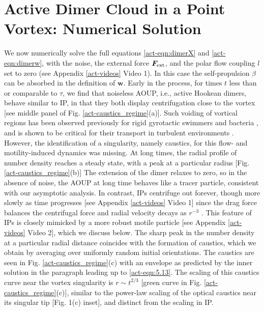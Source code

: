 \documentclass[../Rajarshi-thesis-draft.tex]{subfiles}
\begin{document}
\section{Active Dimer Cloud in a Point Vortex: Numerical Solution}
\label{act-hookeancloud}
We now numerically solve the full equations \eqref{act-eqn:dimerX} and \eqref{act-eqn:dimerw}, with the noise, the external force $\vec{F}_{\rm ext}$, %
and the polar flow coupling $l$ set to zero (see Appendix \ref{act-videos} Video 1). In this case the self-propulsion $\beta$ can be absorbed in the definition of $\mathbf{w}$. 
Early in the process, for times $t$ less than or comparable to $\tau$, we find that noiseless AOUP, i.e., active Hookean dimers, behave similar to IP, in that they both display centrifugation close to the vortex [see middle panel of Fig. \ref{act-caustics_regime}(a)]. Such voiding of vortical regions has been observed previously 
for rigid gyrotactic swimmers \cite{Durham2011} and bacteria \cite{Sokolov2016}, and is shown to be critical for their transport in turbulent environments \cite{Zhan2014,Torney2007}. 
However, the identification of a singularity, namely caustics, for this flow- and motility-induced dynamics was missing. At long times, the radial profile of number density reaches a steady state, with a peak at a particular radius [Fig. \ref{act-caustics_regime}(b)] 
The extension of the dimer relaxes to zero, so in the absence of noise, the AOUP at long time behaves like a tracer particle, consistent with our asymptotic analysis. In contrast, IPs centrifuge out forever, though more slowly as time progresses [see Appendix \ref{act-videos} Video 1] since the drag force balances the centrifugal force and radial velocity decays as $r^{-3}$ \cite{Croor2022}. This feature of IPs is closely mimicked by a more robust 
motile particle [see Appendix \ref{act-videos} Video 2], which we discuss below.
The sharp peak in the number density at a particular radial distance coincides with the formation of caustics, which we obtain by averaging 
over uniformly random initial orientations. The caustics are seen in Fig. \ref{act-caustics_regime}(c) with an envelope as predicted by the inner solution in the paragraph leading up to \eqref{act-eqn:5.13}. The scaling of this caustics curve near the vortex singularity is $r \sim t^{2/3}$ [green curve in Fig. \ref{act-caustics_regime}(c)], similar to the power-law scaling of the optical caustics near its singular tip \cite{eggers_fontelos_2015} [Fig. 1(c) inset], and distinct from the scaling in IP. 
\end{document}
